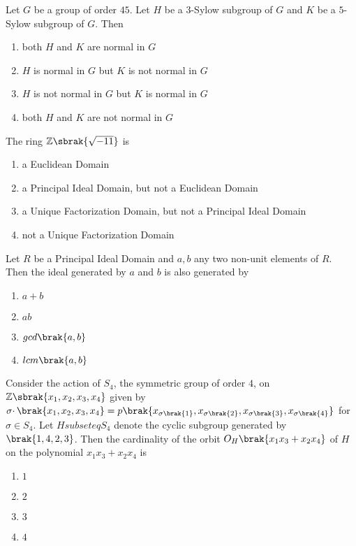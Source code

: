 \item{
Let $G$ be a group of order $45$. Let $H$ be a $3$-Sylow subgroup of $G$ and $K$ be a $5$-Sylow subgroup of $G$. Then
\begin{multicols}{2}
\begin{enumerate}
\item both $H$ and $K$ are normal in $G$ 
\item $H$ is normal in $G$ but $K$ is not normal in $G$
\item $H$ is not normal in $G$ but $K$ is normal in $G$
\item both $H$ and $K$ are not normal in $G$
\end{enumerate}
\end{multicols}
}
\item{
The ring $\mathbb{Z}\sbrak{\sqrt{-11}}$ is 
\begin{multicols}{2}
\begin{enumerate}
\item a Euclidean Domain
\item a Principal Ideal Domain, but not a Euclidean Domain
\item a Unique Factorization Domain, but not a Principal Ideal Domain
\item not a Unique Factorization Domain
\end{enumerate}
\end{multicols}
}
\item{
Let $R$ be a Principal Ideal Domain and $a,b$ any two non-unit elements of $R$. Then the ideal generated by $a$ and $b$ is also generated by
\begin{multicols}{4}
\begin{enumerate}
\item $a+b$
\item $ab$
\item $gcd\brak{a,b}$
\item $lcm\brak{a,b}$
\end{enumerate}
\end{multicols}
}
\item{
Consider the action of $S_4$, the symmetric group of order $4$, on $\mathbb{Z}\sbrak{x_1,x_2,x_3,x_4}$ given by $\sigma\cdotp\brak{x_1,x_2,x_3,x_4}=p\brak{x_{\sigma\brak{1}},x_{\sigma\brak{2}},x_{\sigma\brak{3}},x_{\sigma\brak{4}}}$ for $\sigma\in S_4$. Let $Hsubseteq S_4$ denote the cyclic subgroup generated by $\brak{1,4,2,3}$. Then the cardinality of the orbit $O_H\brak{x_1x_3+x_2x_4}$ of $H$ on the polynomial $x_1x_3+x_2x_4$ is
\begin{multicols}{4}
\begin{enumerate}
\item $1$
\item $2$
\item $3$
\item $4$
\end{enumerate}
\end{multicols}
}
